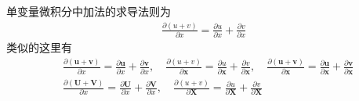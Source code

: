 \documentclass{ctexart}
\newcommand{\blue}[1]{\textcolor{Solarized-blue}{#1}}
\theoremstyle{definition}
\def \uv {\bm{u}}
\def \vv {\bm{v}}
\def \xv {\bm{x}}
\def \Uv {\mathbf{U}}
\def \Vv {\mathbf{V}}
\def \Xv {\mathbf{X}}
\begin{document}
单变量微积分中\blue{加法}的求导法则为
\begin{align*}
    \frac{\partial (u+v)}{\partial x} = \frac{\partial u}{\partial x} + \frac{\partial v}{\partial x}
\end{align*}
类似的这里有
\begin{align*}
     & \frac{\partial (\uv + \vv)}{\partial x} = \frac{\partial \uv}{\partial x} + \frac{\partial \vv}{\partial x}, \quad \frac{\partial (u+v)}{\partial \xv} = \frac{\partial u}{\partial \xv} + \frac{\partial v}{\partial \xv}, \quad \frac{\partial (\uv + \vv)}{\partial \xv} = \frac{\partial \uv}{\partial \xv} + \frac{\partial \vv}{\partial \xv} \\
     & \frac{\partial (\Uv + \Vv)}{\partial x} = \frac{\partial \Uv}{\partial x} + \frac{\partial \Vv}{\partial x}, \quad \frac{\partial (u + v)}{\partial \Xv} = \frac{\partial u}{\partial \Xv} + \frac{\partial v}{\partial \Xv}
\end{align*}
\end{document}
